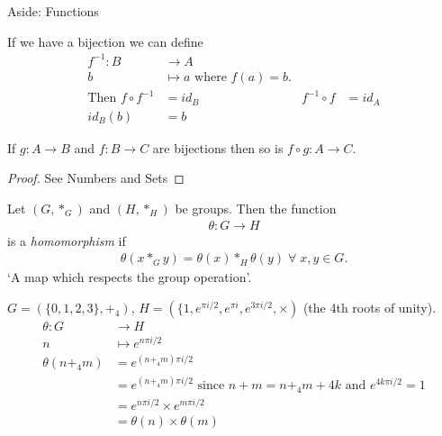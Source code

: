 \begin{aside}{Aside: Functions}
\begin{definition}
  If we have a bijection we can define
  \begin{align*}
      f^{-1}: B &\to A &&\\
      b &\mapsto a \text{ where } f(a) = b. &&\\
      \text{Then } f \circ f^{-1} &= id_B & f^{-1} \circ f &= id_A \\
      id_B(b) &= b
  \end{align*}
\end{definition} 

\begin{lemma}
\protect\hypertarget{lem:two}{}\label{lem:two}If \(g: A \to B\) and \(f: B \to C\) are bijections then so is \(f \circ g: A \to C\).
\end{lemma}

\begin{proof}
See Numbers and Sets
\end{proof}

\end{aside}

\begin{definition}
\protect\hypertarget{def:homomorphism}{}\label{def:homomorphism}
Let \((G, *_G)\) and \((H, *_H)\) be groups. Then the function
\begin{align*}
    \theta : G \to H
\end{align*} is a \emph{homomorphism} if
\begin{align*}
    \theta(x *_G y) = \theta(x) *_H \theta(y) \; \forall \; x, y \in G.
\end{align*}
`A map which respects the group operation'.
\end{definition}

\begin{example}
\protect\hypertarget{exm:isomorphism}{}\label{exm:isomorphism}
\(G = (\{ 0, 1, 2, 3 \}, +_4)\), \(H = (\{1, e^{\pi i/2}, e^{\pi i}, e^{3\pi i/2}, \times)\) (the 4th roots of unity).
\begin{align*}
    \theta: G &\to H \\
    n &\mapsto e^{n \pi i /2} \\
    \theta(n +_4 m) &= e^{(n +_4 m) \pi i /2} \\
    &= e^{(n +_4 m) \pi i /2} \text{ since $n + m = n +_4 m + 4k$ and $e^{4k \pi i /2} = 1$} \\
    &= e^{n \pi i /2} \times e^{m \pi i /2} \\
    &= \theta(n) \times \theta(m)
\end{align*}
\end{example}

